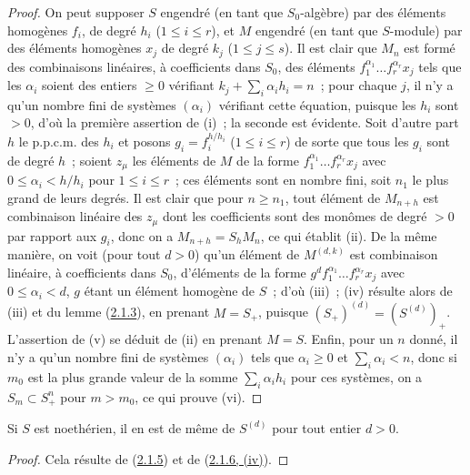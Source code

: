 \begin{proof}
On peut supposer $S$ engendré (en tant que $S_0$-algèbre) par des éléments
homogènes $f_i$, de degré $h_i$ ($1\leq i\leq r$), et $M$ engendré (en tant
que $S$-module) par des éléments homogènes $x_j$ de degré $k_j$
($1\leq j\leq s$). Il est clair que $M_n$ est formé des combinaisons
linéaires, à coefficients dans $S_0$, des éléments
$f_1^{\alpha_1}\ldots f_r^{\alpha_r}x_j$ tels que les $\alpha_i$ soient des
entiers $\geq 0$ vérifiant $k_j+\sum_i\alpha_i h_i=n$~; pour chaque $j$, il
n'y a qu'un nombre fini de systèmes $(\alpha_i)$ vérifiant cette équation,
puisque les $h_i$ sont $>0$, d'où la première assertion de (i)~; la seconde
est évidente. Soit d'autre part $h$ le p.p.c.m. des $h_i$ et posons
$g_i=f_i^{h/h_i}$ ($1\leq i\leq r$) de sorte que tous les $g_i$ sont de
degré $h$~; soient $z_\mu$ les éléments de $M$ de la forme
$f_1^{\alpha_1}\ldots f_r^{\alpha_r}x_j$ avec
$0\leq\alpha_i<h/h_i$ pour $1\leq i\leq r$~; ces éléments sont en nombre
fini, soit $n_1$ le plus grand de leurs degrés. Il est clair que pour
$n\geq n_1$, tout élément de $M_{n+h}$ est combinaison linéaire des $z_\mu$
dont les coefficients sont des monômes de degré $>0$ par rapport aux $g_i$,
donc on a $M_{n+h}=S_hM_n$, ce qui établit (ii). De la même manière, on voit
(pour tout $d>0$) qu'un élément de $M^{(d,k)}$ est combinaison linéaire, à
coefficients dans $S_0$, d'éléments de la forme
$g^df_1^{\alpha_1}\ldots f_r^{\alpha_r}x_j$ avec
$0\leq\alpha_i<d$, $g$ étant un élément homogène de $S$~; d'où (iii)~; (iv)
résulte alors de (iii) et du lemme (\hyperref[II.2.1.3-fr]{2.1.3}), en
prenant $M=S_+$, puisque $(S_+)^{(d)}=(S^{(d)})_+$. L'assertion de (v) se
déduit de (ii) en prenant $M=S$. Enfin, pour un $n$ donné, il n'y a qu'un
nombre fini de systèmes $(\alpha_i)$ tels que $\alpha_i\geq 0$ et
$\sum_i\alpha_i<n$, donc si $m_0$ est la plus grande valeur de la somme
$\sum_i\alpha_i h_i$ pour ces systèmes, on a $S_m\subset S_+^n$ pour
$m>m_0$, ce qui prouve (vi).
\end{proof}

\begin{corollary}[2.1.7]
\label{II.2.1.7-fr}
Si $S$ est noethérien, il en est de même de $S^{(d)}$ pour tout entier
$d>0$.
\end{corollary}

\begin{proof}
Cela résulte de (\hyperref[II.2.1.5-fr]{2.1.5}) et de
(\hyperref[II.2.1.6-fr]{2.1.6, (iv)}).
\end{proof}

